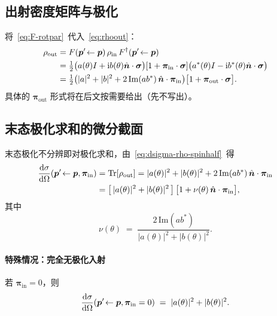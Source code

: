 \subsection{出射密度矩阵与极化}

将~\eqref{eq:F-rotpar}~代入~\eqref{eq:rhoout}：
\begin{align}
  \rho_{\text{out}}
  &= F(\bm{p}'\!\leftarrow\bm{p})\,\rho_{\text{in}}\,F^\dagger(\bm{p}'\!\leftarrow\bm{p}) \notag\\
  &= \tfrac{1}{2}\big(a(\theta)I + \mathrm{i} b(\theta)\hat{\bm n}\cdot\bm{\sigma}\big)
     [1+\bm{\pi}_{\text{in}}\cdot\bm{\sigma}]
     \big(a^*(\theta)I - \mathrm{i} b^*(\theta)\hat{\bm n}\cdot\bm{\sigma}\big) \notag\\
  &= \tfrac{1}{2}\big(|a|^2 + |b|^2 + 2\,\mathrm{Im}(ab^*)\,\hat{\bm n}\cdot\bm{\pi}_{\text{in}}\big)
     \big[1 + \bm{\pi}_{\text{out}}\cdot\bm{\sigma}\big].
  \label{eq:rho-out-spinhalf}
\end{align}
具体的 $\bm{\pi}_{\text{out}}$ 形式将在后文按需要给出（先不写出）。

\subsection{末态极化求和的微分截面}

末态极化不分辨即对极化求和，由~\eqref{eq:dsigma-rho-spinhalf}~得
\begin{align}
  \frac{\mathrm{d}\sigma}{\mathrm{d}\Omega}(\bm{p}'\!\leftarrow\bm{p},\bm{\pi}_{\text{in}})
  &= \operatorname{Tr}[\rho_{\text{out}}] = |a(\theta)|^2 + |b(\theta)|^2 + 2\,\mathrm{Im}(ab^*)\,\hat{\bm n}\cdot\bm{\pi}_{\text{in}} \notag\\
  &= \big[\,|a(\theta)|^2 + |b(\theta)|^2\,\big]\,\big[1 + \nu(\theta)\,\hat{\bm n}\cdot\bm{\pi}_{\text{in}}\big],
  \label{eq:dsigma-piin}
\end{align}
其中
\begin{equation}
  \nu(\theta) \;=\; \frac{2\,\mathrm{Im}(ab^*)}{|a(\theta)|^2 + |b(\theta)|^2}.
  \label{eq:nu-def}
\end{equation}

\paragraph{特殊情况：完全无极化入射} 若 $\bm{\pi}_{\text{in}}=0$，则
\begin{equation}
  \frac{\mathrm{d}\sigma}{\mathrm{d}\Omega}(\bm{p}'\!\leftarrow\bm{p},\bm{\pi}_{\text{in}}=0)
  \;=\; |a(\theta)|^2 + |b(\theta)|^2.
  \label{eq:dsigma-unpol}
\end{equation}


